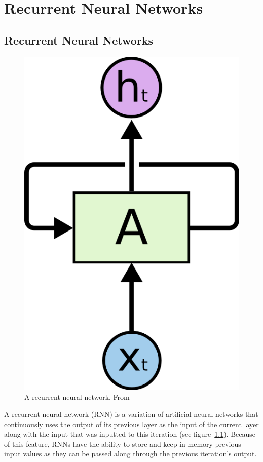 \chapter{Recurrent Neural Networks}\label{ch:rnn}

\section{Recurrent Neural Networks}
\begin{figure}
	\begin{center}
		\includegraphics[scale=0.5]{rnn/rnn_rolled}
	\end{center}
	\caption{A recurrent neural network. From~\cite{RNNRolled2015}\label{fig:rnn_img}}
\end{figure}

A recurrent neural network (RNN) is a variation of artificial neural networks that continuously uses the output of its previous layer as the input of the current layer along with the input that was inputted to this iteration (see figure~\ref{fig:rnn_img}). Because of this feature, RNNs have the ability to store and keep in memory previous input values as they can be passed along through the previous iteration's output. 


